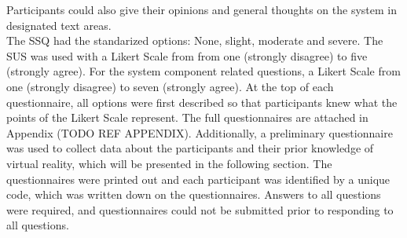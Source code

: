 Participants could also give their opinions and general thoughts on the system in designated text areas.
\\ The SSQ had the standarized options: None, slight, moderate and severe.
The SUS was used with a Likert Scale from from one (strongly disagree) to five (strongly agree).
For the system component related questions, a Likert Scale from one (strongly disagree) to seven (strongly agree).
At the top of each questionnaire, all options were first described so that participants knew what the points of the Likert Scale represent.
The full questionnaires are attached in Appendix (TODO REF APPENDIX).
Additionally, a preliminary questionnaire was used to collect data about the participants and their prior knowledge of virtual reality, which will be presented in the following section.
The questionnaires were printed out and each participant was identified by a unique code, which was written down on the questionnaires.
Answers to all questions were required, and questionnaires could not be submitted prior to responding to all questions.